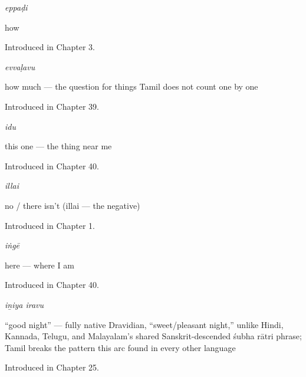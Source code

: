 \noindent\begin{minipage}[t]{\linewidth}
\raggedright
\textbf{}\enspace\emph{eppaḍi}\par
\small how\par
\footnotesize Introduced in Chapter 3.
\end{minipage}\par\medskip

\noindent\begin{minipage}[t]{\linewidth}
\raggedright
\textbf{}\enspace\emph{evvaḷavu}\par
\small how much — the question for things Tamil does not count one by one\par
\footnotesize Introduced in Chapter 39.
\end{minipage}\par\medskip

\noindent\begin{minipage}[t]{\linewidth}
\raggedright
\textbf{}\enspace\emph{idu}\par
\small this one — the thing near me\par
\footnotesize Introduced in Chapter 40.
\end{minipage}\par\medskip

\noindent\begin{minipage}[t]{\linewidth}
\raggedright
\textbf{}\enspace\emph{illai}\par
\small no / there isn't (illai — the negative)\par
\footnotesize Introduced in Chapter 1.
\end{minipage}\par\medskip

\noindent\begin{minipage}[t]{\linewidth}
\raggedright
\textbf{}\enspace\emph{iṅgē}\par
\small here — where I am\par
\footnotesize Introduced in Chapter 40.
\end{minipage}\par\medskip

\noindent\begin{minipage}[t]{\linewidth}
\raggedright
\textbf{ }\enspace\emph{iṉiya iravu}\par
\small \textquotedblleft{}good night\textquotedblright{} — fully native Dravidian, \textquotedblleft{}sweet/pleasant night,\textquotedblright{} unlike Hindi, Kannada, Telugu, and Malayalam's shared Sanskrit-descended śubha rātri phrase; Tamil breaks the pattern this arc found in every other language\par
\footnotesize Introduced in Chapter 25.
\end{minipage}\par\medskip

